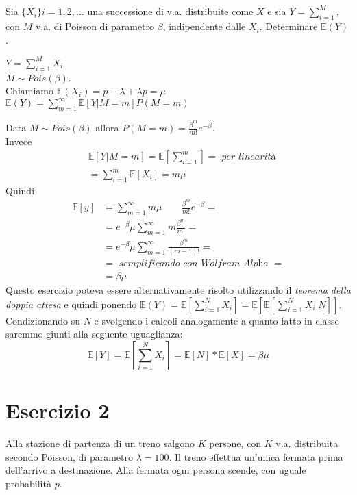 \documentclass[a4paper]{article}
\newcommand{\E}[0]{\mathbb{E}}
\begin{document}
\subsection{}
Sia $\{X_i\}i=1,2,...$ una successione di v.a. distribuite come $X$ e sia $Y = \sum_{i=1}^M$, con $M$ v.a. di Poisson di parametro $\beta$, indipendente dalle $X_i$. Determinare $\E(Y)$.


$Y=\sum_{i=1}^M X_i$ \\ $M \sim Pois(\beta)$. \\ Chiamiamo $\E(X_i) = p -\lambda + \lambda p = \mu$\\
$\E(Y)=\sum_{m=1}^{\infty} \E[Y|M=m]P(M=m)$


Data $M \sim Pois(\beta)$ allora $P(M=m) = \frac{\beta^m}{m!} e^{-\beta}$.\\
Invece 
\begin{align*}
	&\E[Y|M=m] = \E[\sum_{i=1}^m] = \textit{ per linearità}\\
	& = \sum_{i=1}^m\E[X_i]=m\mu
\end{align*}
Quindi 
\begin{align*}
	\E[y] & = \sum_{m=1}^{\infty} m\mu \qquad \frac{\beta^m}{m!} e^{-\beta}=\\
	      & = e^{-\beta} \mu \sum_{m=1}^{\infty} m\frac{\beta^m}{m!}=\\
	      & = e^{-\beta} \mu \sum_{m=1}^{\infty} \frac{\beta^m}{(m-1)!}=\\
	      & = \textit{ semplificando con Wolfram Alpha } =\\
	      &=\beta \mu
\end{align*}
Questo esercizio poteva essere alternativamente risolto utilizzando il \textit{teorema della doppia attesa} e quindi ponendo 
$\E(Y)=\E[\sum_{i=1}^{N}X_i]=\E[\E[\sum_{i=1}^{N}X_i|N]]$.\\
Condizionando su $N$ e svolgendo i calcoli analogamente a quanto fatto in classe saremmo giunti alla seguente uguaglianza: %
$$\E[Y]=\E[\sum_{i=1}^{N}X_i]= \E[N] * \E[X] = \beta \mu$$
\section{Esercizio 2}
Alla stazione di partenza di un treno salgono $K$ persone, con $K$ v.a. distribuita secondo Poisson, di parametro $\lambda = 100$. Il treno effettua un’unica fermata prima dell’arrivo a destinazione. Alla fermata ogni persona scende, con uguale probabilità $p$.
\end{document}

